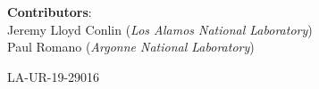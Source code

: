 \thispagestyle{plain}
\maketitle

\begin{center}\large
\textbf{Contributors}: \\
Jeremy Lloyd Conlin (\emph{Los Alamos National Laboratory}) \\
Paul Romano (\emph{Argonne National Laboratory})
\end{center}

\vspace{4in}
\begin{center}
  \Large LA-UR-19-29016
\end{center}


\newpage
\pagestyle{front}
\tableofcontents
\clearpage
\listoftodos
